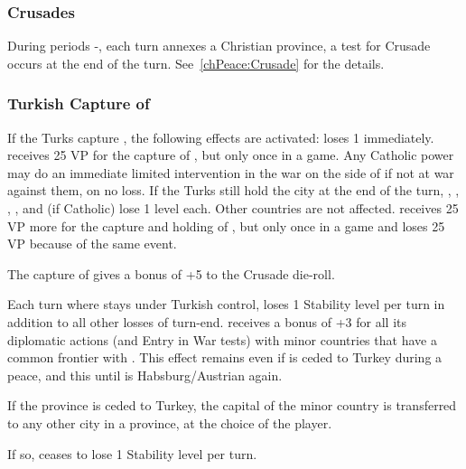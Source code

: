 \label{chSpecific:Crusades and Vienna}


\subsubsection{Crusades}\label{chSpecific:Crusades}
\aparag During periods -, each turn \TUR annexes a
Christian province, a test for Crusade occurs at the end of the turn.
\bparag See~\ref{chPeace:Crusade} for the details.

\subsubsection{Turkish Capture of }\label{chSpecific:Fall
  Vienna}
\aparag If the Turks capture , the following effects are
activated:
\bparag \HAB loses 1 \STAB immediately. \TUR receives 25 VP for the capture of
, but only once in a game.
\bparag Any Catholic power may do an immediate limited intervention in the war
on the side of \HAB if not at war against them, on no \STAB loss.
\bparag If the Turks still hold the city at the end of the turn, \VEN, \FRA,
\ENG, \SPA, \AUT and \POL (if Catholic) lose 1 \STAB level each.  Other
countries are not affected.  \TUR receives 25 VP more for the capture and
holding of , but only once in a game and \HAB loses 25 VP
because of the same event.

The capture of  gives a bonus of +5 to the Crusade die-roll.

Each turn where  stays under Turkish control, \HAB loses 1
Stability level per turn in addition to all other losses of turn-end.
\bparag \MAJHAB receives a bonus of +3 for all its diplomatic actions (and
Entry in War tests) with minor countries that have a common frontier with
\AUSaus. This effect remains even if  is ceded to Turkey during
a peace, and this until  is Habsburg/Austrian again.

If the province  is ceded to Turkey, the capital of the
 minor country is transferred to any other city in a
 province, at the choice of the \HAB player.

\bparag If so, \HAB ceases to lose 1 Stability level per turn.

